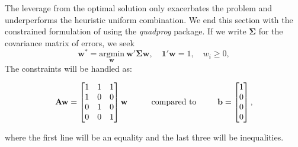 \documentclass[]{krantz}
\makeatletter
\newenvironment{Shaded}{\begin{snugshade}}{\end{snugshade}}
\newcommand{\CommentTok}[1]{\textcolor[rgb]{0.37,0.37,0.37}{\textit{#1}}}
\newcommand{\DataTypeTok}[1]{\textcolor[rgb]{0.27,0.27,0.27}{#1}}
\newcommand{\DecValTok}[1]{\textcolor[rgb]{0.06,0.06,0.06}{#1}}
\newcommand{\KeywordTok}[1]{\textcolor[rgb]{0.27,0.27,0.27}{\textbf{#1}}}
\newcommand{\NormalTok}[1]{#1}
\newcommand{\OperatorTok}[1]{\textcolor[rgb]{0.43,0.43,0.43}{\textbf{#1}}}
\newcommand{\StringTok}[1]{\textcolor[rgb]{0.5,0.5,0.5}{#1}}
\newenvironment{kframe}{%
\medskip{}
\setlength{\fboxsep}{.8em}
 \def\at@end@of@kframe{}%
 \ifinner\ifhmode%
  \def\at@end@of@kframe{\end{minipage}}%
  \begin{minipage}{\columnwidth}%
 \fi\fi%
 \def\FrameCommand##1{\hskip\@totalleftmargin \hskip-\fboxsep
 \colorbox{shadecolor}{##1}\hskip-\fboxsep
     \hskip-\linewidth \hskip-\@totalleftmargin \hskip\columnwidth}%
 \MakeFramed {\advance\hsize-\width
   \@totalleftmargin\z@ \linewidth\hsize
   \@setminipage}}%
 {\par\unskip\endMakeFramed%
 \at@end@of@kframe}
\renewenvironment{Shaded}{\begin{kframe}}{\end{kframe}}
\theoremstyle{definition}
\theoremstyle{definition}
\theoremstyle{definition}
\theoremstyle{remark}
\makeatother
\begin{document}
\normalsize

The leverage from the optimal solution only exacerbates the problem and
underperforms the heuristic uniform combination. We end this section
with the constrained formulation of \citet{breiman1996stacked} using the
\emph{quadprog} package. If we write \(\mathbf{\Sigma}\) for the
covariance matrix of errors, we seek
\[\mathbf{w}^*=\underset{\mathbf{w}}{\text{argmin}} \ \mathbf{w}'\mathbf{\Sigma}\mathbf{w}, \quad \mathbf{1}'\mathbf{w}=1, \quad w_i\ge 0,\]
The constraints will be handled as:

\[\mathbf{A} \mathbf{w}= \begin{bmatrix} 
1 & 1 & 1 \\
1 & 0 & 0\\
0 & 1 & 0 \\
0 & 0 & 1
\end{bmatrix} \mathbf{w} \hspace{9mm} \text{ compared to} \hspace{9mm} \mathbf{b}=\begin{bmatrix} 1 \\ 0 \\ 0 \\ 0 \end{bmatrix},  \]

where the first line will be an equality and the last three will be
inequalities.

\footnotesize

\begin{Shaded}
\end{Shaded}
\end{document}
